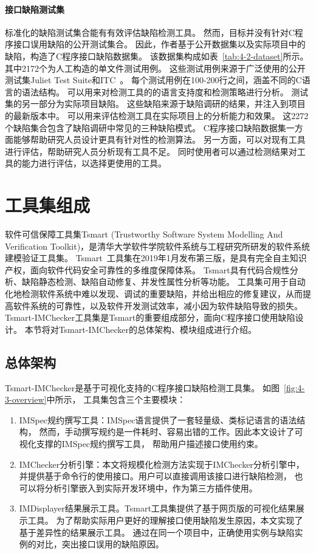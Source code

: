 \paragraph{接口缺陷测试集}
标准化的缺陷测试集合能有有效评估缺陷检测工具。
然而，目标并没有针对C程序接口误用缺陷的公开测试集合。
因此，作者基于公开数据集以及实际项目中的缺陷，构造了C程序接口缺陷数据集。
该数据集构成如表~\ref{tab:4-2-dataset}所示。
其中2172个为人工构造的单文件测试用例。
这些测试用例来源于广泛使用的公开测试集Juliet Test Suite和ITC~\cite{itc}。
每个测试用例在100-200行之间，涵盖不同的C语言的语法结构。
可以用来对检测工具的的语言支持度和检测策略进行分析。
测试集的另一部分为实际项目缺陷。
这些缺陷来源于缺陷调研的结果，并注入到项目的最新版本中。
可以用来评估检测工具在实际项目上的分析能力和效果。
这2272个缺陷集合包含了缺陷调研中常见的三种缺陷模式。
C程序接口缺陷数据集一方面能够帮助研究人员设计更具有针对性的检测算法。
另一方面，可以对现有工具进行评估，帮助研究人员分析现有工具不足。
同时使用者可以通过检测结果对工具的能力进行评估，以选择更使用的工具。


\section{工具集组成}
\label{sec:4.3}
软件可信保障工具集Tsmart (Trustworthy Software System Modelling And Verification Toolkit)，是清华大学软件学院软件系统与工程研究所研发的软件系统建模验证工具集。
Tsmart~\cite{tsmart}工具集在2019年1月发布第三版，是具有完全自主知识产权，面向软件代码安全可靠性的多维度保障体系。
Tsmart具有代码合规性分析、缺陷静态检测、缺陷自动修复、并发性属性分析等功能。
工具集可用于自动化地检测软件系统中难以发现、调试的重要缺陷，并给出相应的修复建议，从而提高软件系统的可靠性，以及软件开发测试效率，减小因为软件缺陷导致的损失。
Tsmart-IMChecker工具集是Tsmart的重要组成部分，面向C程序接口使用缺陷设计。
本节将对Tsmart-IMChecker的总体架构、模块组成进行介绍。

\subsection{总体架构}
Tsmart-IMChecker是基于可视化支持的C程序接口缺陷检测工具集。
如图~\ref{fig:4-3-overview}中所示，
工具集包含三个主要模块：
\begin{enumerate}
	\item IMSpec规约撰写工具：IMSpec语言提供了一套轻量级、类标记语言的语法结构，
	然而，手动撰写规约是一件耗时、容易出错的工作。因此本文设计了可视化支撑的IMSpec规约撰写工具，
	帮助用户描述接口使用约束。
	\item IMChecker分析引擎：本文将规模化检测方法实现于IMChecker分析引擎中，
	并提供基于命令行的使用接口。用户可以直接调用该接口进行缺陷检测，
	也可以将分析引擎嵌入到实际开发环境中，作为第三方插件使用。
	\item IMDisplayer结果展示工具。Tsmart工具集提供了基于网页版的可视化结果展示工具。
	为了帮助实际用户更好的理解接口使用缺陷发生原因，本文实现了基于差异性的结果展示工具。
	通过在同一个项目中，正确使用实例与缺陷实例的对比，突出接口误用的缺陷原因。
\end{enumerate}

